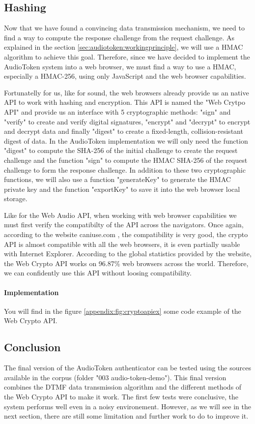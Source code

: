 \documentclass[twocolumn,14pt]{extarticle}
\begin{document}
\subsection{Hashing}
Now that we have found a convincing data transmission mechanism, we need to find a way to compute the response challenge from the request challenge. As explained in the section \ref{sec:audiotoken:workingprinciple}, we will use a HMAC algorithm to achieve this goal. Therefore, since we have decided to implement the AudioToken system into a web browser, we must find a way to use a HMAC, especially a HMAC-256, using only JavaScript and the web browser capabilities.

Fortunatelly for us, like for sound, the web browsers already provide us an native API to work with hashing and encryption. This API is named the "Web Crytpo API" and provide us an interface with 5 cryptographic methods: "sign" and "verify" to create and verify digital signatures, "encrypt" and "decrypt" to encrypt and decrypt data and finally "digest" to create a fixed-length, collision-resistant digest of data. In the AudioToken implementation we will only need the function "digest" to compute the SHA-256 of the initial challenge to create the request challenge and the function "sign" to compute the HMAC SHA-256 of the request challenge to form the response challenge. In addition to these two cryptographic functions, we will also use a function "generateKey" to generate the HMAC private key and the function "exportKey" to save it into the web browser local storage.

Like for the Web Audio API, when working with web browser capabilities we must first verify the compatibilty of the API across the navigators. Once again, according to the website caniuse.com \cite{can_i_use_crypto}, the compatibility is very good, the crypto API is almost compatible with all the web browsers, it is even partially usable with Internet Explorer. According to the global statistics provided by the website, the Web Crypto API works on 96.87\% web browsers across the world. Therefore, we can confidently use this API without loosing compatibility.

\paragraph{Implementation}
You will find in the figure \ref{appendix:fig:cryptoapiex} some code example of the Web Crypto API.

\subsection{Conclusion}
The final version of the AudioToken authenticator can be tested using the sources available in the corpus (folder "003 audio-token-demo"). This final version combines the DTMF data transmission algorithm and the different methods of the Web Crypto API to make it work. The first few tests were conclusive, the system performs well even in a noisy environement. However, as we will see in the next section, there are still some limitation and further work to do to improve it.
\end{document}
